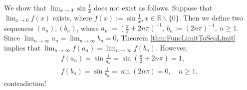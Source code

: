 \begin{exm}
  \label{exm:nonexistLimitForShowingEpsDelt}
  We show that $\lim_{x\rightarrow 0}\sin \frac{1}{x}$ does not exist
  as follows. Suppose that $\lim_{x\rightarrow 0}f(x)$ exists, where
  $f(x):=\sin \frac{1}{x}, x\in \mathbb{R}\backslash \{0\}.$
  Then we define two sequences $(a_{n}),(b_{n})$, where
  $a_{n}:=(\frac{\pi}{2}+2n\pi)^{-1},\
      b_{n}:=(2n\pi)^{-1},\ n\ge 1.$
  Since $\lim_{n\rightarrow\infty}a_{n}=\lim_{n\rightarrow\infty}b_{n}=0$,
  Theorem \ref{thm:FuncLimitToSeqLimit} implies
  that $\lim_{n\rightarrow\infty}f(a_{n})=\lim_{n\rightarrow\infty}f(b_{n})$.
  However,
  \begin{displaymath}
    \begin{array}{l}
      f(a_{n})=\sin \frac{1}{a_{n}}=\sin(\frac{\pi}{2}+2n\pi)=1,\\
      f(b_{n})=\sin \frac{1}{b_{n}}=\sin(2n\pi)=0,\quad n\ge 1,
    \end{array}
  \end{displaymath}
  contradiction!
\end{exm}

